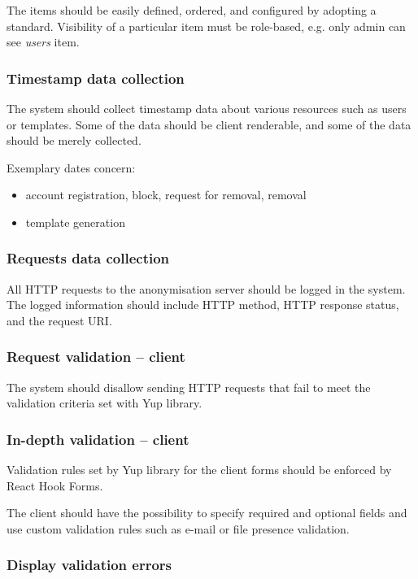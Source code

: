 \documentclass[a4paper,twoside,12pt]{book}
\begin{document}
The items should be easily defined, ordered, and configured by adopting a standard. Visibility of a particular item must be role-based, e.g. only admin can see \textit{users} item.

\subsubsection{Timestamp data collection}

The system should collect timestamp data about various resources such as users or templates. Some of the data should be client renderable, and some of the data should be merely collected.

Exemplary dates concern:
\begin{itemize}
\item account registration, block, request for removal, removal
\item template generation
\end{itemize}

\subsubsection{Requests data collection}

All HTTP requests to the anonymisation server should be logged in the system. The logged information should include HTTP method, HTTP response status, and the request URI.	

\subsubsection{Request validation – client}

The system should disallow sending HTTP requests that fail to meet the validation criteria set with Yup library.

\subsubsection{In-depth validation – client}

Validation rules set by Yup library for the client forms should be enforced by React Hook Forms. 

The client should have the possibility to specify required and optional fields and use custom validation rules such as e-mail or file presence validation.

\subsubsection{Display validation errors}
\end{document}
